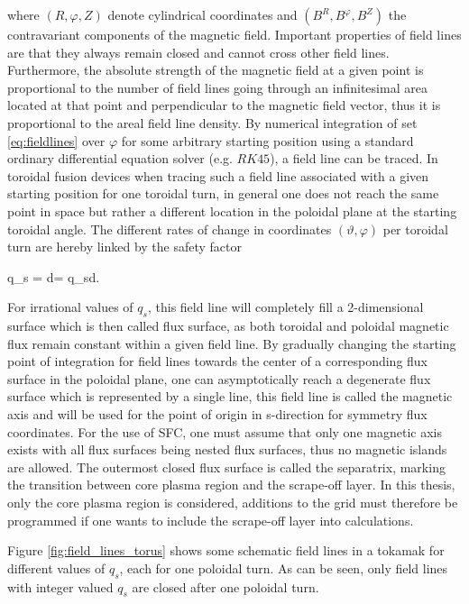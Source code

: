 \documentclass[./main.tex]{subfiles}
\begin{document}
where $(R,\varphi,Z)$ denote cylindrical coordinates and $(B^R,B^\varphi,B^Z)$ the contravariant components of the magnetic field. Important properties of field lines are that they always remain closed and cannot cross other field lines. Furthermore, the absolute strength of the magnetic field at a given point is proportional to the number of field lines going through an infinitesimal area located at that point and perpendicular to the magnetic field vector, thus it is proportional to the areal field line density.\newline
By numerical integration of set \ref{eq:fieldlines} over $\varphi$ for some arbitrary starting position using a standard ordinary differential equation solver (e.g. $RK45$), a field line can be traced.
In toroidal fusion devices when tracing such a field line associated with a given starting position for one toroidal turn, in general one does not reach the same point in space but rather a different location in the poloidal plane at the starting toroidal angle. The different rates of change in coordinates $(\vartheta,\varphi)$ per toroidal turn are hereby linked by the safety factor 

q_s =  \hspace{0.4cm}\hspace{0.4cm} \textrm{d}\varphi= q_s\textrm{d}\vartheta.
\ee

For irrational values of $q_s$, this field line will completely fill a 2-dimensional surface which is then called flux surface, as both toroidal and poloidal magnetic flux remain constant within a given field line. By gradually changing the starting point of integration for field lines towards the center of a corresponding flux surface in the poloidal plane, one can asymptotically reach a degenerate flux surface which is represented by a single line, this field line is called the magnetic axis and will be used for the point of origin in s-direction for symmetry flux coordinates. For the use of SFC, one must assume that only one magnetic axis exists with all flux surfaces being nested flux surfaces, thus no magnetic islands are allowed.
The outermost closed flux surface is called the separatrix, marking the transition between core plasma region and the scrape-off layer. In this thesis, only the core plasma region is considered, additions to the grid must therefore be programmed if one wants to include the scrape-off layer into calculations.

Figure \ref{fig:field_lines_torus} shows some schematic field lines in a tokamak for different values of $q_s$, each for one poloidal turn. As can be seen, only field lines with integer valued $q_s$ are closed after one poloidal turn. 
\end{document}
